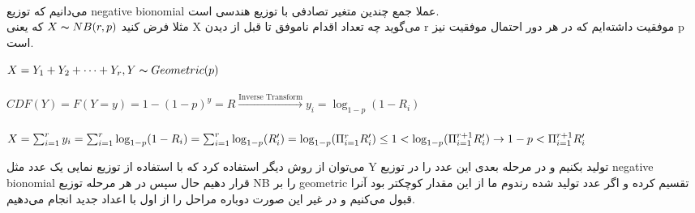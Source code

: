 \\
می‌دانیم که توزیع negative bionomial عملا جمع چندین متغیر تصادفی با توزیع هندسی است.\\
مثلا فرض کنید $X \thicksim  NB(r,p)$ که یعنی X می‌گوید چه تعداد اقدام ناموفق تا قبل از دیدن r موفقیت داشته‌ایم که در هر دور احتمال موفقیت نیز p است.
\begin{latin}
  $X = Y_1 + Y_2 + \cdots + Y_r, Y \thicksim Geometric(p)$\\\\
  $CDF(Y) = F(Y=y) = 1 - (1-p)^y = R \xrightarrow[]{\text{Inverse Transform}} y_i = \log_{1-p}(1-R_i)$ \\\\
  $X = \sum_{i=1}^{r}y_i = \sum_{i=1}^{r}\log_{1-p}(1-R_i) = \sum_{i=1}^{r}\log_{1-p}(R'_i) =\log_{1-p}(\Pi_{i=1}^{r}R'_i) \leq 1 < \log_{1-p}(\Pi_{i=1}^{r+1}R'_i) \\\\
   \rightarrow 1 - p < \Pi_{i=1}^{r+1}R'_i$
\end{latin}
می‌توان از روش دیگر استفاده کرد که با استفاده از توزیع نمایی یک عدد مثل Y تولید بکنیم و در مرحله بعدی این عدد را در توزیع negative bionomial قرار دهیم حال سپس در هر مرحله توزیع NB را بر geometric تقسیم کرده و اگر عدد تولید شده رندوم ما از این مقدار کوچکتر بود آنرا قبول می‌کنیم و در غیر این صورت دوباره مراحل را از اول با اعداد جدید انجام می‌دهیم.